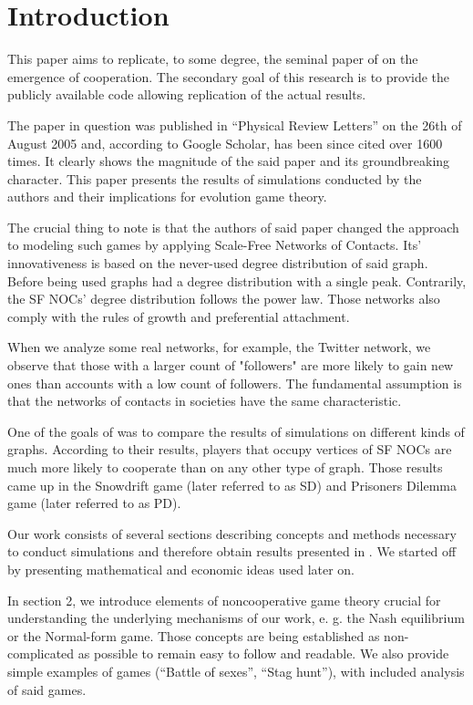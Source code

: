 \documentclass[english, twoside, 12pt, a4paper]{article}
\theoremstyle{definition}
\theoremstyle{plain}
\theoremstyle{remark}
\begin{document}
\section{Introduction}

This paper aims to replicate, to some degree, the seminal paper of \cite{santos2005scale} on the emergence of cooperation. The secondary goal of this research is to provide the publicly available code allowing replication of the actual results.
 
The paper in question was published in \enquote{Physical Review Letters} on the 26th of August 2005 and, according to Google Scholar, has been since cited over 1600 times. It clearly shows the magnitude of the said paper and its groundbreaking character. This paper presents the results of simulations conducted by the authors and their implications for evolution game theory.
 
The crucial thing to note is that the authors of said paper changed the approach to modeling such games by applying Scale-Free Networks of Contacts. Its' innovativeness is based on the never-used degree distribution of said graph. Before being used graphs had a degree distribution with a single peak. Contrarily, the SF NOCs' degree distribution follows the power law.  Those networks also comply with the rules of growth and preferential attachment. 

When we analyze some real networks, for example, the Twitter network, we observe that those with a larger count of "followers" are more likely to gain new ones than accounts 
with a low count of followers. The fundamental assumption is that the networks of contacts in societies have the same characteristic. 
 
One of the goals of \cite{santos2005scale} was to compare the results of simulations on different kinds of graphs. According to their results, players that occupy vertices of SF NOCs are much more likely to cooperate than on any other type of graph. Those results came up in the Snowdrift game (later referred to as SD) and Prisoners Dilemma game (later referred to as PD).  

Our work consists of several sections describing concepts and methods necessary to conduct simulations and therefore obtain results presented in \cite{santos2005scale}. We started off by presenting mathematical and economic ideas used later on. 

In section 2, we introduce elements of noncooperative game theory crucial for understanding the underlying mechanisms of our work, e. g. the Nash equilibrium or the Normal-form game. Those concepts are being established as non-complicated as possible to remain easy to follow and readable. We also provide simple examples of games (\enquote{Battle of sexes}, \enquote{Stag hunt}), with included analysis of said games.
\end{document}
